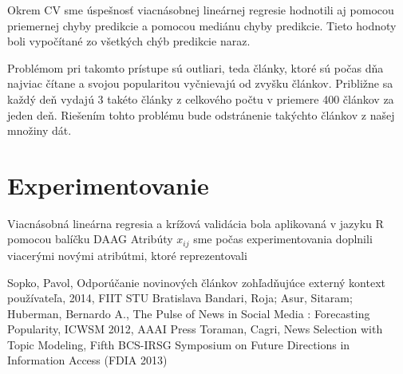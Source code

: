 \documentclass[runningheads,a4paper]{llncs}
\begin{document}
Okrem CV sme úspešnosť viacnásobnej lineárnej regresie hodnotili aj pomocou priemernej chyby predikcie a pomocou mediánu chyby predikcie. Tieto hodnoty boli vypočítané zo všetkých chýb predikcie naraz.

Problémom pri takomto prístupe sú outliari, teda články, ktoré sú počas dňa najviac čítane a svojou popularitou vyčnievajú od zvyšku článkov. Približne sa každý deň vydajú 3 takéto články z celkového počtu v priemere 400 článkov za jeden deň. Riešením tohto problému bude odstránenie takýchto článkov z našej množiny dát.

\section{Experimentovanie}
Viacnásobná lineárna regresia a krížová validácia bola aplikovaná v jazyku R pomocou balíčku DAAG
Atribúty $x_{ij}$ sme počas experimentovania doplnili viacerými novými atribútmi, ktoré reprezentovali   

\begin{thebibliography}{7}
   Sopko, Pavol, Odporúčanie novinových článkov zohľadňujúce externý kontext používateľa, 2014, FIIT STU Bratislava
   Bandari, Roja; Asur, Sitaram; Huberman, Bernardo A., The Pulse of News in Social Media : Forecasting Popularity, ICWSM 2012, AAAI Press
   Toraman, Cagri, News Selection with Topic Modeling, Fifth BCS-IRSG Symposium on Future Directions in Information Access (FDIA 2013)
\end{thebibliography}
\end{document}
